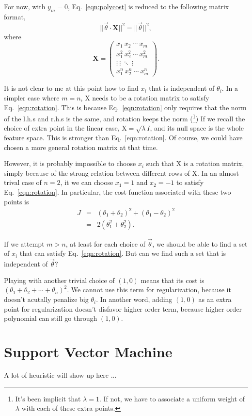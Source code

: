 For now, with $y_m=0$, Eq.~\ref{eqn:polycost} is reduced to the following matrix format,
\begin{equation}
||\vec\theta\cdot\mathbf X||^2 = ||\vec\theta||^2,\label{eqn:rotation}
\end{equation} 
where
\begin{equation}
\mathbf X = \begin{pmatrix}
x_1\ x_2\ \cdots\ x_m\\
x_1^2\ x_2^2\ \cdots\ x_m^2\\
\vdots\ \vdots\ \ddots\ \vdots\\
x_1^n\ x_2^n\ \cdots\ x_m^n
\end{pmatrix}.
\end{equation}


It is not clear to me at this point how to find $x_i$ that is independent of $\theta_i$. In a simpler case where $m = n$, $\mathrm X$ needs to be a rotation matrix to satisfy Eq.~\ref{eqn:rotation}. This is because Eq.~\ref{eqn:rotation} only requires that the norm of the l.h.s and r.h.s is the same, and rotation keeps the norm (\footnote{It's been implicit that $\lambda=1$. If not, we have to associate a uniform weight of $\lambda$ with each of these extra points.}) If we recall the choice of extra point in the linear case, $\mathrm X=\sqrt{\lambda}I$, and its null space is the whole feature space. This is stronger than Eq.~\ref{eqn:rotation}. Of course, we could have chosen a more general rotation matrix at that time.

However, it is probably impossible to choose $x_i$ such that $\mathrm X$ is a rotation matrix, simply because of the strong relation between different rows of $\mathrm X$. In an almost trival case of $n=2$, it we can choose $x_1=1$ and $x_2=-1$ to satisfy Eq.~\ref{eqn:rotation}. In particular, the cost function associated with these two points is 
\begin{eqnarray}
J& = & \left(\theta_1 + \theta_2 \right)^2 + \left(\theta_1-\theta_2\right)^2\\
 & = & 2(\theta_1^2 + \theta_2^2).
\end{eqnarray}

If we attempt $m>n$, at least for each choice of $\vec\theta$, we should be able to find a set of $x_i$ that can satisfy Eq.~\ref{eqn:rotation}. But can we find such a set that is independent of $\vec\theta$?

Playing with another trivial choice of $(1, 0)$ means that its cost is $(\theta_1 + \theta_2 + \cdots + \theta_n)^2$. We cannot use this term for regularization, because it doesn't acutally penalize big $\theta_i$. In another word, adding $(1, 0)$ as an extra point for regularization doesn't disfavor higher order term, because higher order polynomial can still go through $(1,0)$.

\section{Support Vector Machine}
A lot of heuristic will show up here ...
